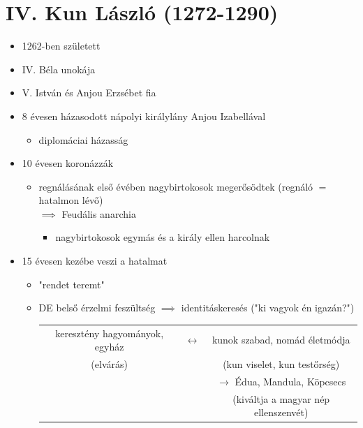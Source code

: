 \documentclass{article}
\begin{document}
\section{IV. Kun László (1272-1290)}

\begin{itemize}
    \item 1262-ben született
    \item IV. Béla unokája
    \item V. István és Anjou Erzsébet fia
    \item 8 évesen házasodott nápolyi királylány Anjou Izabellával
    
    \begin{itemize}
        \item diplomáciai házasság
    \end{itemize}
    
    \item 10 évesen koronázzák 
    \begin{itemize}
        \item regnálásának  első évében nagybirtokosok megerősödtek (regnáló $=$ hatalmon lévő) \\ %
         $\implies$ Feudális anarchia           \begin{itemize} %
                \item nagybirtokosok egymás és a király ellen harcolnak
         \end{itemize}
    \end{itemize}
    
    \item 15 évesen kezébe veszi a hatalmat 
    \begin{itemize}
        \item "rendet teremt"
        \item DE belső érzelmi feszültség $\implies$ identitáskeresés ("ki vagyok én igazán?")

        \begin{tabular}{c c c}
            keresztény hagyományok, egyház & $\leftrightarrow$ & kunok szabad, nomád életmódja \\
             (elvárás) & & (kun viselet, kun testőrség) \\
             & & $\rightarrow$ Édua, Mandula, Köpcsecs \\
             & & (kiváltja a magyar nép ellenszenvét)
        \end{tabular}
    \end{itemize}
    

\end{itemize}
\end{document}
